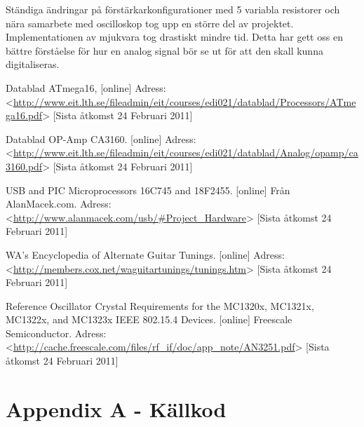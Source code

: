 \documentclass[a4paper]{article}
\begin{document}
Ständiga ändringar på förstärkarkonfigurationer med 5 variabla resistorer och nära samarbete med oscilloskop tog upp en större del av projektet. Implementationen av mjukvara tog drastiskt mindre tid. Detta har gett oss en bättre förståelse för hur en analog signal bör se ut för att den skall kunna digitaliseras.

\begin{thebibliography}{9}

  Datablad ATmega16,
 [online]
 Adress: <\url{http://www.eit.lth.se/fileadmin/eit/courses/edi021/datablad/Processors/ATmega16.pdf}>
 [Sista åtkomst 24 Februari 2011] 
 
  Datablad OP-Amp CA3160.
 [online]
 Adress: <\url{http://www.eit.lth.se/fileadmin/eit/courses/edi021/datablad/Analog/opamp/ca3160.pdf}> 
 [Sista åtkomst 24 Februari 2011] 
 
  USB and PIC Microprocessors 16C745 and 18F2455.
 [online]
 Från AlanMacek.com.
 Adress: <\url{http://www.alanmacek.com/usb/#Project_Hardware}>
 [Sista åtkomst 24 Februari 2011] 
 
  WA's Encyclopedia of Alternate Guitar Tunings.
 [online]
 Adress: <\url{http://members.cox.net/waguitartunings/tunings.htm}>
 [Sista åtkomst 24 Februari 2011] 
 
 Reference Oscillator Crystal Requirements for the MC1320x, MC1321x, MC1322x, and MC1323x IEEE 802.15.4 Devices.
 [online]
 Freescale Semiconductor.
 Adress: <\url{http://cache.freescale.com/files/rf_if/doc/app_note/AN3251.pdf}>
 [Sista åtkomst 24 Februari 2011] 
\end{thebibliography}

\section{Appendix A - Källkod}
\lstset{tabsize=2, breaklines=true, basicstyle=\small\ttfamily, basewidth=0.51em}

\end{document}
